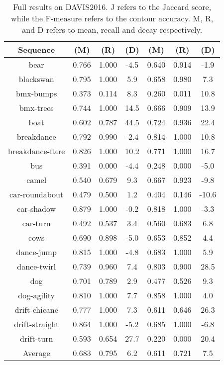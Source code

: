 \begin{table}[!htb]
\footnotesize
\centering
\begin{tabular}{c|ccc|ccc}

Sequence&(M)&(R)&(D)&(M)&(R)&(D)\\ \hline
bear& 0.766& 1.000&-4.5& 0.640& 0.914&-1.9\\
blackswan& 0.795& 1.000& 5.9& 0.658& 0.980& 7.3\\
bmx-bumps& 0.373& 0.114& 8.3& 0.260& 0.011& 10.8\\
bmx-trees& 0.744& 1.000& 14.5& 0.666& 0.909& 13.9\\
boat& 0.602& 0.787& 44.5& 0.724& 0.936& 22.4\\
breakdance& 0.792& 0.990&-2.4& 0.814& 1.000& 10.8\\
breakdance-flare& 0.826& 1.000& 10.2& 0.771& 1.000& 16.7\\
bus& 0.391& 0.000&-4.4& 0.248& 0.000&-5.0\\
camel& 0.540& 0.679& 9.3& 0.667& 0.923&-9.8\\
car-roundabout& 0.479& 0.500& 1.2& 0.404& 0.146&-10.6\\
car-shadow& 0.879& 1.000&-0.2& 0.818& 1.000&-3.3\\
car-turn& 0.492& 0.537& 3.4& 0.560& 0.683& 6.8\\
cows& 0.690& 0.898&-5.0& 0.653& 0.852& 4.4\\
dance-jump& 0.815& 1.000&-4.8& 0.683& 1.000& 5.9\\
dance-twirl& 0.739& 0.960& 7.4& 0.803& 0.900&28.5\\
dog& 0.701& 0.789& 2.9& 0.477& 0.526& 9.3\\
dog-agility& 0.810& 1.000& 7.7& 0.858& 1.000& 4.0\\
drift-chicane& 0.777& 1.000& 7.3& 0.611& 0.646& 26.3\\
drift-straight& 0.864& 1.000&-5.2& 0.685& 1.000&-6.8\\
drift-turn& 0.593& 0.654& 27.7& 0.220& 0.000& 20.4\\ \hline
Average& 0.683& 0.795& 6.2 & 0.611& 0.721& 7.5  \\ 
\end{tabular}
\caption{Full results on DAVIS2016. J refers to the Jaccard score, while the F-measure refers to the contour accuracy. M, R, and D refers to mean, recall and decay respectively.}
\label{tab:davis}
\end{table}


